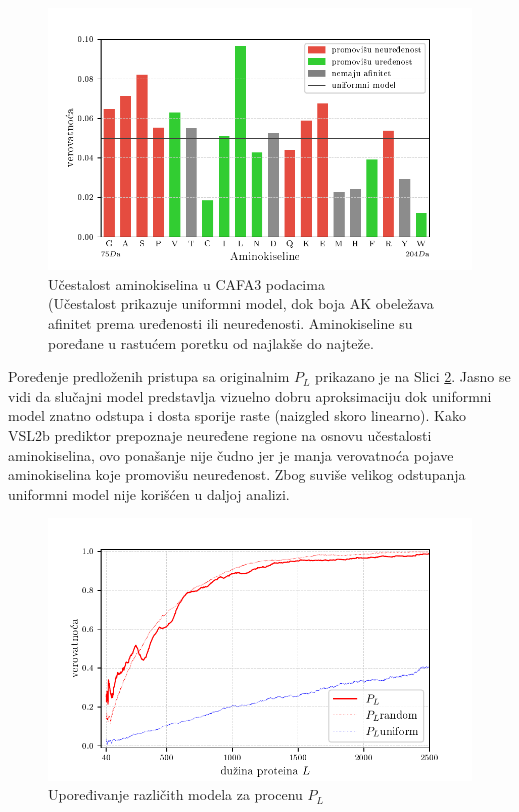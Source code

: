 \begin{figure}[th]
\centering
\includegraphics[]{plots/AK_ucestalost}
\caption{
  Učestalost aminokiselina u CAFA3 podacima
  \\ \footnotesize
  (Učestalost prikazuje uniformni model, dok boja AK obeležava afinitet prema
  uređenosti ili neuređenosti. Aminokiseline su poređane u rastućem poretku
  od najlakše do najteže. 
}
\label{fig:AK_ucestalost}
\end{figure}

Poređenje predloženih pristupa sa originalnim $P_L$ prikazano je na Slici
\ref{fig:PL2}. Jasno se vidi
da slučajni model predstavlja vizuelno dobru aproksimaciju dok uniformni model
znatno odstupa i dosta sporije raste (naizgled skoro linearno). Kako VSL2b
prediktor prepoznaje neuređene regione na osnovu učestalosti aminokiselina, ovo
ponašanje nije čudno jer je manja verovatnoća pojave aminokiselina koje
promovišu neuređenost. Zbog suviše velikog odstupanja uniformni model nije
korišćen u daljoj analizi.


\begin{figure}[th]
\centering
\includegraphics[]{plots/PL_F_cmp}
\caption{Upoređivanje različith modela za procenu $P_L$}
\label{fig:PL2}
\end{figure}


